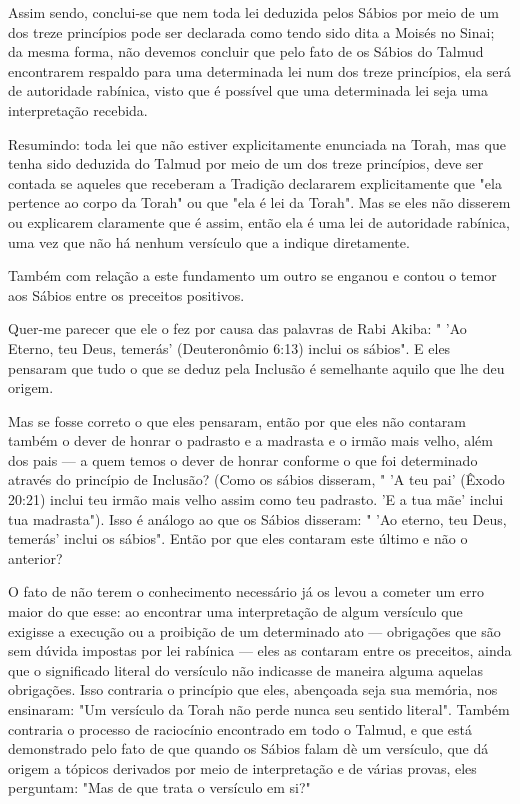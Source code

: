 \begin{itemize}
\begin{enumrate}
Assim sendo, conclui-se que nem toda lei deduzida pelos Sábios por meio
de um dos treze princípios pode ser declarada como tendo sido dita a
Moisés no Sinai; da mesma forma, não devemos concluir que pelo fato de
os Sábios do Talmud encontrarem respaldo para uma determinada lei num
dos treze princípios, ela será de autoridade rabínica, visto que é
possível que uma
determinada lei seja uma interpretação recebida.

Resumindo: toda lei que não estiver explicitamente enunciada na To­rah,
mas que tenha sido deduzida do Talmud por meio de um dos treze
princí­pios, deve ser contada se aqueles que receberam a Tradição
declararem expli­citamente que "ela pertence ao corpo da Torah" ou que
"ela é lei da Torah". Mas se eles não disserem ou explicarem claramente
que é assim, então ela é uma lei de autoridade rabínica, uma vez que não
há nenhum versículo que a indique diretamente.

Também com relação a este fundamento um outro se enganou e con­tou o
temor aos Sábios entre os preceitos positivos.

Quer-me parecer que ele o fez por causa das palavras de Rabi Akiba: "
'Ao Eterno, teu Deus, temerás' (Deuteronômio 6:13) inclui os sábios". E
eles pensaram que tudo o que se deduz pela Inclusão é semelhante aquilo
que lhe deu origem.

Mas se fosse correto o que eles pensaram, então por que eles não
contaram também o dever de honrar o padrasto e a madrasta e o irmão mais
velho, além dos pais --- a quem temos o dever de honrar conforme o que
foi determinado através do princípio de Inclusão? (Como os sábios
disseram, " 'A teu pai' (Êxodo 20:21) inclui teu irmão mais velho assim
como teu padrasto. 'E a tua mãe' inclui tua madrasta"). Isso é análogo
ao que os Sábios disseram: " 'Ao eterno, teu Deus, temerás' inclui os
sábios". Então por que eles conta­ram este último e não o anterior?

O fato de não terem o conhecimento necessário já os levou a come­ter um
erro maior do que esse: ao encontrar uma interpretação de algum
versí­culo que exigisse a execução ou a proibição de um determinado ato
--- obriga­ções que são sem dúvida impostas por lei rabínica --- eles as
contaram entre os preceitos, ainda que o significado literal do
versículo não indicasse de ma­neira alguma aquelas obrigações. Isso
contraria o princípio que eles, abençoa­da seja sua memória, nos
ensinaram: "Um versículo da Torah não perde nunca seu sentido literal".
Também contraria o processo de raciocínio encontrado em todo o Talmud, e
que está demonstrado pelo fato de que quando os Sábios falam dè um
versículo, que dá origem a tópicos derivados por meio de inter­pretação
e de várias provas, eles perguntam: "Mas de que trata o versículo em
si?"


\end{enumrate}
\end{itemize}
